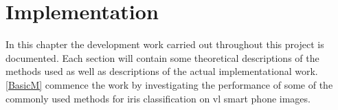 \graphicspath{{figures/implementation/}}
\chapter{Implementation}\label{ch:implementation}\glsresetall

In this chapter the development work carried out throughout this project is documented. Each section will contain some theoretical descriptions of the methods used as well as descriptions of the actual implementational work. \autoref{BasicM} commence the work by investigating the performance of some of the commonly used methods for iris classification on \gls{vl} smart phone images. 





